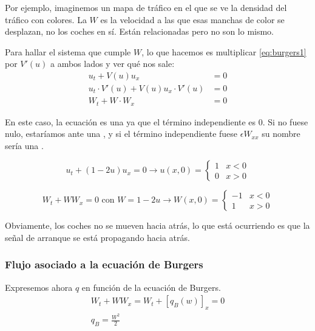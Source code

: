 		Por ejemplo, imaginemos un mapa de tráfico en el que se ve la densidad del tráfico con colores. La $W$ es la velocidad a las que esas manchas de color se desplazan, no los coches en sí. Están relacionadas pero no son lo mismo.

		Para hallar el sistema que cumple $W$, lo que hacemos es multiplicar \eqref{eq:burgers1} por $V'(u)$ a ambos lados y ver qué nos sale:
		\begin{align}
		u_t + V(u)u_x &= 0 \nonumber \\
		u_t · V'(u) + V(u) u_x · V'(u) &= 0 \nonumber \\
		W_t + W · W_x &= 0 \label{eq:Burgers}
		\end{align}

		En este caso, la ecuación es una  ya que el término independiente es $0$. Si no fuese nulo, estaríamos ante una , y si el término independiente fuese $\epsilon W_{xx}$ su nombre sería una .

		\begin{example}
			\[u_t + (1-2u) u_x = 0
			\rightarrow u(x,0) =
			\begin{cases}
				1 & x < 0 \\
				0 & x > 0
			\end{cases}
			\]

			\[W_t + W W_x = 0 \text{ con } W = 1 - 2u
			\rightarrow W(x,0) =
			\begin{cases}
				-1 & x < 0 \\
				1 & x > 0
			\end{cases}
			\]

			Obviamente, los coches no se mueven hacia atrás, lo que está ocurriendo es que la señal de arranque se está propagando hacia atrás.

		\end{example}


		\subsubsection{Flujo asociado a la ecuación de Burgers}

			Expresemos ahora $q$ en función de la ecuación de Burgers.
			\begin{gather}
			W_t + WW_x = W_t + [q_B(w)]_x = 0 \nonumber \\
			q_{B} = \frac{W^2}{2} \label{eq:FlujoBurgers}
			\end{gather}

